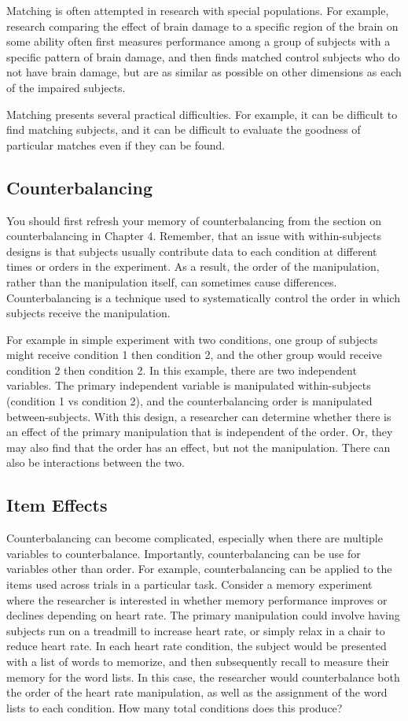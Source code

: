 Matching is often attempted in research with special populations. For example, research comparing the effect of brain damage to a specific region of the brain on some ability often first measures performance among a group of subjects with a specific pattern of brain damage, and then finds matched control subjects who do not have brain damage, but are as similar as possible on other dimensions as each of the impaired subjects.

Matching presents several practical difficulties. For example, it can be difficult to find matching subjects, and it can be difficult to evaluate the goodness of particular matches even if they can be found.

\subsection{Counterbalancing}

You should first refresh your memory of counterbalancing from the section on counterbalancing in Chapter 4. Remember, that an issue with within-subjects designs is that subjects usually contribute data to each condition at different times or orders in the experiment. As a result, the order of the manipulation, rather than the manipulation itself, can sometimes cause differences. Counterbalancing is a technique used to systematically control the order in which subjects receive the manipulation.

For example in simple experiment with two conditions, one group of subjects might receive condition 1 then condition 2, and the other group would receive condition 2 then condition 2. In this example, there are two independent variables. The primary independent variable is manipulated within-subjects (condition 1 vs condition 2), and the counterbalancing order is manipulated between-subjects. With this design, a researcher can determine whether there is an effect of the primary manipulation that is independent of the order. Or, they may also find that the order has an effect, but not the manipulation. There can also be interactions between the two.

\subsection{Item Effects}

Counterbalancing can become complicated, especially when there are multiple variables to counterbalance. Importantly, counterbalancing can be use for variables other than order. For example, counterbalancing can be applied to the items used across trials in a particular task. Consider a memory experiment where the researcher is interested in whether memory performance improves or declines depending on heart rate. The primary manipulation could involve having subjects run on a treadmill to increase heart rate, or simply relax in a chair to reduce heart rate. In each heart rate condition, the subject would be presented with a list of words to memorize, and then subsequently recall to measure their memory for the word lists. In this case, the researcher would counterbalance both the order of the heart rate manipulation, as well as the assignment of the word lists to each condition. How many total conditions does this produce?


